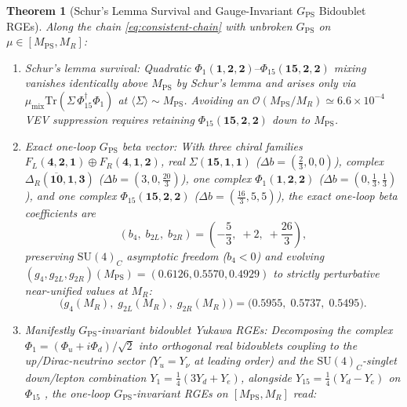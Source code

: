 \documentclass[11pt,a4paper]{article}
\newtheorem{theorem}{Theorem}[section]
\begin{document}
\begin{theorem}[Schur's Lemma Survival and Gauge-Invariant $G_{\mathrm{PS}}$ Bidoublet RGEs]
\label{thm:ps-stabilization}
Along the chain \eqref{eq:consistent-chain} with unbroken $G_{\mathrm{PS}}$ on $\mu \in [M_{\mathrm{PS}}, M_R]$:
\begin{enumerate}[label=(\roman*),leftmargin=1.8em,itemsep=2pt]
\item \emph{Schur's lemma survival:} Quadratic $\Phi_1(\mathbf{1},\mathbf{2},\mathbf{2})\text{--}\Phi_{15}(\mathbf{15},\mathbf{2},\mathbf{2})$ mixing vanishes identically above $M_{\mathrm{PS}}$ by Schur's lemma and arises only via $\mu_{\mathrm{mix}}\mathrm{Tr}(\Sigma\,\Phi_{15}^\dagger \Phi_1)$ at $\langle\Sigma\rangle \sim M_{\mathrm{PS}}$. Avoiding an $\mathcal{O}(M_{\mathrm{PS}}/M_R) \simeq 6.6\times 10^{-4}$ VEV suppression requires retaining $\Phi_{15}(\mathbf{15},\mathbf{2},\mathbf{2})$ down to $M_{\mathrm{PS}}$.
\item \emph{Exact one-loop $G_{\mathrm{PS}}$ beta vector:} With three chiral families $F_L(\mathbf{4},\mathbf{2},\mathbf{1}) \oplus F_R(\mathbf{4},\mathbf{1},\mathbf{2})$, real $\Sigma(\mathbf{15},\mathbf{1},\mathbf{1})$ ($\Delta b = (\frac{2}{3},0,0)$), complex $\Delta_R(\overline{\mathbf{10}},\mathbf{1},\mathbf{3})$ ($\Delta b = (3,0,\frac{20}{3})$), one complex $\Phi_1(\mathbf{1},\mathbf{2},\mathbf{2})$ ($\Delta b = (0,\frac{1}{3},\frac{1}{3})$), and one complex $\Phi_{15}(\mathbf{15},\mathbf{2},\mathbf{2})$ ($\Delta b = (\frac{16}{3},5,5)$), the exact one-loop beta coefficients are
\begin{equation}
(b_4,\; b_{2L},\; b_{2R}) = \left(-\frac{5}{3},\; +2,\; +\frac{26}{3}\right),
\label{eq:ps-betas}
\end{equation}
preserving $\mathrm{SU}(4)_C$ asymptotic freedom ($b_4 < 0$) and evolving $(g_4, g_{2L}, g_{2R})(M_{\mathrm{PS}}) = (0.6126, 0.5570, 0.4929)$ to strictly perturbative near-unified values at $M_R$:
\begin{equation}
\big(g_4(M_R),\; g_{2L}(M_R),\; g_{2R}(M_R)\big) = \big(0.5955,\; 0.5737,\; 0.5495\big).
\label{eq:ps-couplings-MR}
\end{equation}
\item \emph{Manifestly $G_{\mathrm{PS}}$-invariant bidoublet Yukawa RGEs:} Decomposing the complex $\Phi_1 = (\Phi_u + i\Phi_d)/\sqrt{2}$ into orthogonal real bidoublets coupling to the up/Dirac-neutrino sector ($Y_u = Y_\nu$ at leading order) and the $\mathrm{SU}(4)_C$-singlet down/lepton combination $Y_1 = \frac{1}{4}(3Y_d + Y_e)$, alongside $Y_{15} = \frac{1}{4}(Y_d - Y_e)$ on $\Phi_{15}$ \cite{MeloniOhlssonRiad2014}, the one-loop $G_{\mathrm{PS}}$-invariant RGEs on $[M_{\mathrm{PS}}, M_R]$ read:

\end{enumerate}
\end{theorem}
\end{document}
